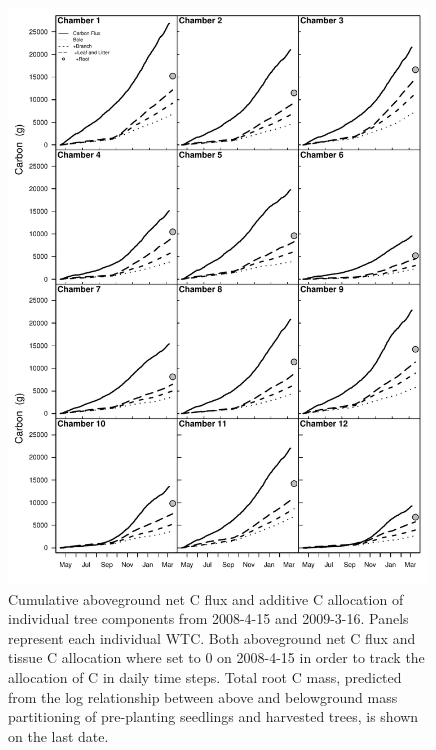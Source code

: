 \documentclass[a4paper]{article}\usepackage[]{graphicx}\usepackage[]{color}
\begin{document}
\begin{figure}[h!]
    \centering
    \includegraphics[width=0.99\textwidth]{treecarbon_daily_chambers2.pdf}
    \caption{Cumulative aboveground net C flux and additive C allocation of individual tree components from 2008-4-15 and 2009-3-16. Panels represent each individual WTC. Both aboveground net C flux and tissue C allocation where set to 0 on 2008-4-15 in order to track the allocation of C in daily time steps. Total root C mass, predicted from the log relationship between above and belowground mass partitioning of pre-planting seedlings and harvested trees, is shown on the last date.}
    \label{fig:figure 4.S2}
\end{figure}


\setcounter{page}{1}     
\clearpage
\end{document}
